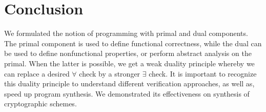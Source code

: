\documentclass[preprint]{sig-alternate-05-2015}
\begin{document}













\section{Conclusion}

We formulated the notion of
programming with primal and dual components.
The primal component is used to define 
functional correctness, while the dual 
can be used to define nonfunctional properties, 
or perform abstract analysis on the primal.
When the latter is possible, we get a weak duality principle
whereby we can replace a desired $\forall$ check
by a stronger $\exists$
check. 
%
It is important to recognize this duality principle to understand
different verification approaches, as well as, speed up 
program synthesis.  We demonstrated its effectiveness on 
synthesis of cryptographic schemes.
\end{document}
